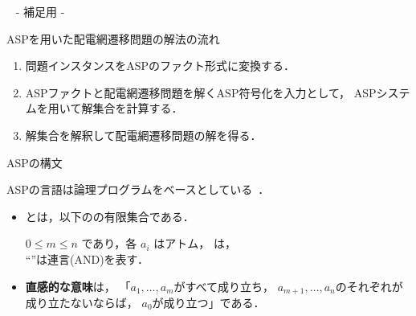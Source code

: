 \appendix
\backupbegin

\begin{frame}{~}
 \centering
 - 補足用 -
\end{frame}
\begin{frame}{ASPを用いた配電網遷移問題の解法の流れ}
 \centering\vfill
 \scalebox{0.6}{\hspace{-1zw}}
 \vfill
 \begin{enumerate}
  \item 問題インスタンスをASPのファクト形式に変換する．
  \item ASPファクトと配電網遷移問題を解くASP符号化を入力として，
        ASPシステムを用いて解集合を計算する．
  \item 解集合を解釈して配電網遷移問題の解を得る．
 \end{enumerate}
\end{frame}
\begin{frame}{ASPの構文}
  \renewcommand{\thefootnote}{\fnsymbol{footnote}}
  \setcounter{footnote}{1}
  \begin{alertblock}{}\centering
    ASPの言語は論理プログラムをベースとしている~\footnotemark．
  \end{alertblock}\vfill
  \begin{itemize}
  \item {}とは，以下のの有限集合である．
    \begin{center}
      \begin{minipage}[c]{0.7\textwidth}
      \end{minipage}
   \end{center}\vfill
    $0 \leq m \leq n$ であり，各 $a_i$ はアトム，
    は，\\
    ``\code{,}''は連言(AND)を表す．
  \item \alert{\bf 直感的な意味}は，
    「$a_1,\ldots,a_m$がすべて成り立ち，
    $a_{m+1},\ldots,a_n$のそれぞれが成り立たないならば，
    $a_0$が成り立つ」である．
  \end{itemize}
\end{frame}
